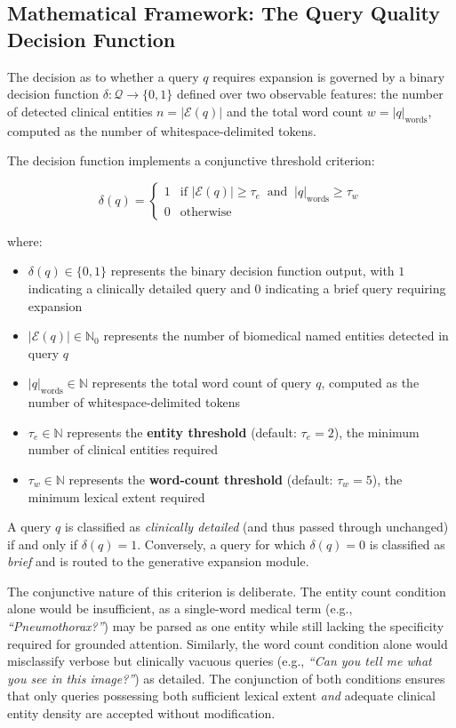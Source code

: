 \subsection{Mathematical Framework: The Query Quality Decision Function}
\label{sec:3_2_3}
The decision as to whether a query $q$ requires expansion is governed by a binary decision function $\delta : \mathcal{Q} \to \{0, 1\}$ defined over two observable features: the number of detected clinical entities $n = |\mathcal{E}(q)|$ and the total word count $w = |q|_{\text{words}}$, computed as the number of whitespace-delimited tokens.

The decision function implements a conjunctive threshold criterion:

$$
\delta(q) = \begin{cases} 1 & \text{if } |\mathcal{E}(q)| \geq \tau_e \;\;\text{and}\;\; |q|_{\text{words}} \geq \tau_w \\ 0 & \text{otherwise} \end{cases}
$$

where:
\begin{itemize}
\item $\delta(q) \in \{0, 1\}$ represents the binary decision function output, with $1$ indicating a clinically detailed query and $0$ indicating a brief query requiring expansion
\item $|\mathcal{E}(q)| \in \mathbb{N}_0$ represents the number of biomedical named entities detected in query $q$
\item $|q|_{\text{words}} \in \mathbb{N}$ represents the total word count of query $q$, computed as the number of whitespace-delimited tokens
\item $\tau_e \in \mathbb{N}$ represents the \textbf{entity threshold} (default: $\tau_e = 2$), the minimum number of clinical entities required
\item $\tau_w \in \mathbb{N}$ represents the \textbf{word-count threshold} (default: $\tau_w = 5$), the minimum lexical extent required
\end{itemize}

A query $q$ is classified as \textit{clinically detailed} (and thus passed through unchanged) if and only if $\delta(q) = 1$. Conversely, a query for which $\delta(q) = 0$ is classified as \textit{brief} and is routed to the generative expansion module.

The conjunctive nature of this criterion is deliberate. The entity count condition alone would be insufficient, as a single-word medical term (e.g., \textit{``Pneumothorax?''}) may be parsed as one entity while still lacking the specificity required for grounded attention. Similarly, the word count condition alone would misclassify verbose but clinically vacuous queries (e.g., \textit{``Can you tell me what you see in this image?''}) as detailed. The conjunction of both conditions ensures that only queries possessing both sufficient lexical extent \textit{and} adequate clinical entity density are accepted without modification.

